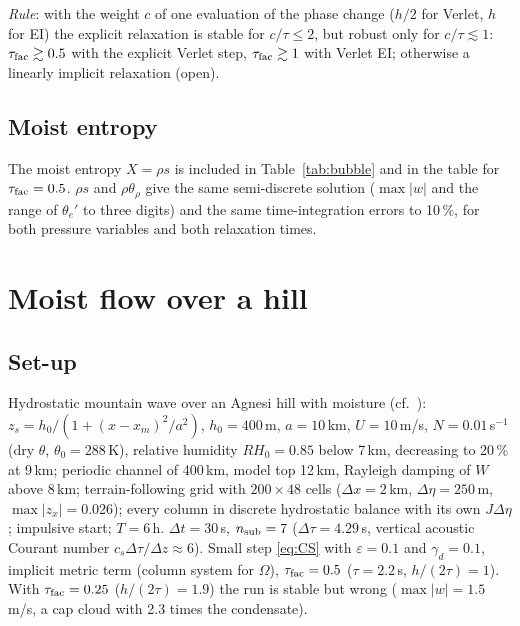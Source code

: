 \documentclass[11pt,a4paper]{article}
\newcommand{\dtau}{\Delta\tau}
\newcommand{\dt}{\Delta t}
\begin{document}
\emph{Rule}: with the weight $c$ of one evaluation of the phase change ($h/2$ for Verlet, $h$ for EI) the
explicit relaxation is stable for $c/\tau\le2$, but robust only for $c/\tau\lesssim1$: $\tau_{\rm fac}\gtrsim0.5$ with the
explicit Verlet step, $\tau_{\rm fac}\gtrsim1$ with Verlet EI; otherwise a linearly implicit relaxation (open).

\subsection{Moist entropy}
The moist entropy $X=\rho s$ is included in Table~\ref{tab:bubble} and in the table for $\tau_{\rm fac}=0.5$. $\rho s$ and
$\rho\theta_\rho$ give the same semi-discrete solution ($\max|w|$ and the range of $\theta_e'$ to three digits) and the same
time-integration errors to 10\,\%, for both pressure variables and both relaxation times.

\section{Moist flow over a hill}\label{sec:hill}
\subsection{Set-up}
Hydrostatic mountain wave over an Agnesi hill \cite{pinty} with moisture (cf.\ \cite{durranklemp83}):
$z_s=h_0/(1+(x-x_m)^2/a^2)$, $h_0=400$\,m, $a=10$\,km, $U=10$\,m/s, $N=0.01$\,s$^{-1}$ (dry $\theta$, $\theta_0=288$\,K),
relative humidity $RH_0=0.85$ below 7\,km, decreasing to 20\,\% at 9\,km; periodic channel of 400\,km,
model top 12\,km, Rayleigh damping of $W$ above 8\,km; terrain-following grid with $200\times48$ cells
($\Delta x=2$\,km, $\Delta\eta=250$\,m, $\max|z_x|=0.026$); every column in discrete hydrostatic balance with its own
$J\Delta\eta$; impulsive start; $T=6$\,h. $\dt=30$\,s, $n_{\rm sub}=7$ ($\dtau=4.29$\,s, vertical acoustic Courant
number $c_s\dtau/\Delta z\approx6$). Small step \eqref{eq:CS} with $\varepsilon=0.1$ and $\gamma_d=0.1$, implicit metric term
(column system for $\Omega$), $\tau_{\rm fac}=0.5$ ($\tau=2.2$\,s, $h/(2\tau)=1$). With $\tau_{\rm fac}=0.25$ ($h/(2\tau)=1.9$) the run is
stable but wrong ($\max|w|=1.5$\,m/s, a cap cloud with 2.3 times the condensate).
\end{document}
